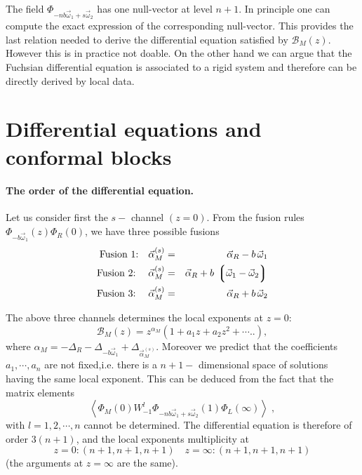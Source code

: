 \documentclass[12pt,a4paper]{article}
\def\ll{\left\lgroup}
\def\rr{\right\rgroup}
\def\be{\begin{equation}}
\def\ee{\end{equation}}
\newcommand{\< }{{\langle}}
\renewcommand{\>}{{\rangle}}
\newcommand{\cB}{\mathcal{B}}
\def\ll{ \left\lgroup}
\def\rr{\right\rgroup}
\newcommand{\0}{\textbf{0.}}
\newcommand{\1}{\textbf{1.}}
\newcommand{\2}{\textbf{2.}}
\newcommand{\3}{\textbf{3.}}
\newcommand{\4}{\textbf{4.}}
\newcommand{\5}{\textbf{5.}}
\newcommand{\6}{\textbf{6.}}
\newcommand{\7}{\textbf{7.}}
\newcommand{\8}{\textbf{8.}}
\newcommand{\9}{\textbf{9.}}
\begin{document}
The field $\Phi_{- n b \vec{\omega}_1+s\vec{\omega}_2}$ has one null-vector at level $n+1$. In principle one can compute the exact expression of the  corresponding null-vector. This provides the last relation needed to derive the  differential equation satisfied by $\cB_M(z)$. However this is in practice not doable. On the other hand we can argue that the Fuchsian differential equation is associated to a rigid system and therefore can be directly derived by local data.


\section{Differential equations and conformal blocks}

\paragraph{The order of the differential equation.} Let us consider first the $s-$ channel $(z=0)$. From the fusion rules 
$\Phi_{-b \vec{\omega}_1} (z)\Phi_{R}(0)$,  we have three possible fusions
\begin{eqnarray}
\text{Fusion 1:}\quad 
\vec{\alpha}_M^{(s)} &=& \vec{\alpha}_R- b \,     \vec{\omega}_1 \\
\text{Fusion 2:}\; \quad 
      \vec{\alpha}_M^{(s)} &=& \vec{\alpha}_R+ b \, \ll \vec{\omega}_1 - \vec{\omega}_2 \rr   \\
\text{Fusion 3:}\;\quad
\vec{\alpha}_M^{(s)} &=& \vec{\alpha}_R+ b \,     \vec{\omega}_2  
\end{eqnarray}

The above three channels determines the local exponents at $z=0$:
\begin{equation}
\cB_M(z) = z^{\alpha_M}\left(1+a_1 z +a_2 z^2+\cdots..\right),
\end{equation}
where $\alpha_{M} = -\Delta_{R}-\Delta_{-b \vec{\omega}_1}+\Delta_{\vec{\alpha}_M^{(s)}}$. Moreover we predict that the coefficients $a_1, \cdots, a_{n}$ are not fixed,i.e. there is a $n+1-$ dimensional space of solutions having the same local exponent. This can be deduced from the fact that the matrix elements 
\be 
\left< \Phi_{M}(0) W_{-1}^{l}\Phi_{-n b \vec{\omega}_1+s \vec{\omega}_2 }(1) \Phi_{L}(\infty)\right>\;,
\ee 
with $l=1,2,\cdots,n$ cannot be determined. The differential equation is therefore of order $3(n+1)$, and the local exponents  multiplicity at 
 \begin{equation}
 z=0: (n+1,n+1,n+1) \quad z=\infty: (n+1,n+1,n+1)
 \end{equation}
 (the arguments at $z=\infty$ are the same).
\end{document}
